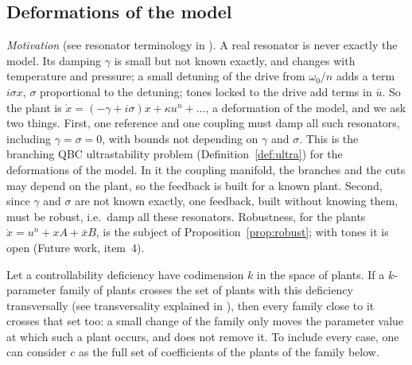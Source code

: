 \documentclass[11pt,reqno]{amsart}
\theoremstyle{plain}
\theoremstyle{definition}
\theoremstyle{remark}
\begin{document}
\subsection{Deformations of the model}\label{sec:deformations}
\emph{Motivation} (see resonator terminology in \cite{NayfehMook1979}). A real resonator is never exactly the model. Its damping $\gamma$ is small but not known exactly, and changes with temperature and pressure; a small detuning of the drive from $\omega_0/n$ adds a term $i\sigma x$, $\sigma$ proportional to the detuning; tones locked to the drive add terms in $\bar u$. So the plant is $\dot x=(-\gamma+i\sigma)x+\kappa u^{n}+\dots$, a deformation of the model, and we ask two things. First, one reference and one coupling must damp all such resonators, including $\gamma=\sigma=0$, with bounds not depending on $\gamma$ and $\sigma$. This is the branching QBC ultrastability problem (Definition~\ref{def:ultra}) for the deformations of the model. In it the coupling manifold, the branches and the cuts may depend on the plant, so the feedback is built for a known plant. Second, since $\gamma$ and $\sigma$ are not known exactly, one feedback, built without knowing them, must be robust, i.e.\ damp all these resonators. Robustness, for the plants $\dot x=u^{n}+xA+\bar xB$, is the subject of Proposition~\ref{prop:robust}; with tones it is open (Future work, item~4).

Let a controllability deficiency have codimension $k$ in the space of plants. If a $k$-parameter family of
plants crosses the set of plants with this deficiency transversally (see transversality explained in \cite{AGV}), then every family close to it crosses that set
too: a small change of the family only moves the parameter value at which such a plant occurs, and does not
remove it. To include every case, one can consider $c$ as the full set of coefficients of the plants of the family below.
\end{document}
